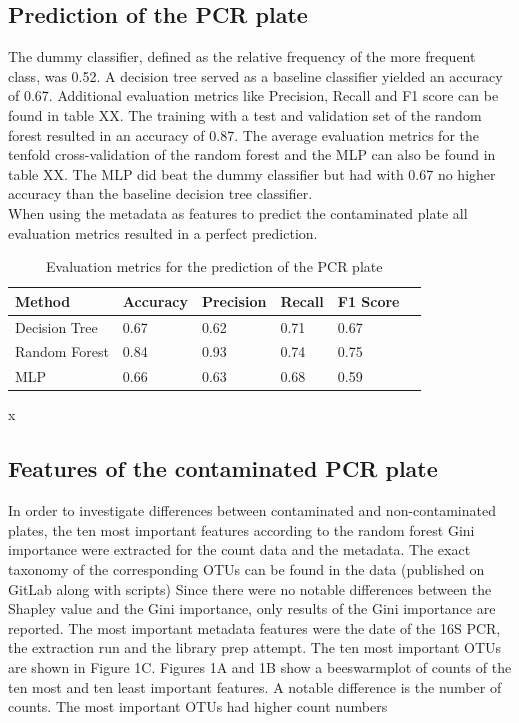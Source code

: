 \documentclass{svproc}
\begin{document}
\subsection{Prediction of the PCR plate}
The dummy classifier, defined as the relative frequency of the more frequent class, was 0.52. A decision tree served as a baseline classifier yielded an accuracy of 0.67. Additional evaluation metrics like Precision, Recall and F1 score can be found in table XX. The training with a test and validation set of the random forest resulted in an accuracy of 0.87. The average evaluation metrics for the tenfold cross-validation of the random forest and the MLP can also be found in table XX. The MLP did beat the dummy classifier but had with 0.67 no higher accuracy than the baseline decision tree classifier. \\
When using the metadata as features to predict the contaminated plate all evaluation metrics resulted in a perfect prediction.
\begin{table}
   \caption{Evaluation metrics for the prediction of the PCR plate}
   \begin{center}
       \begin{tabular}{l@{\quad}lllll}
           \hline
         
                  Method & Accuracy & Precision & Recall & F1 Score\\[2pt]
                                   \hline\rule{0pt}{12pt}
                   Decision Tree  &    0.67 & 0.62 & 0.71 & 0.67 \\
                   Random Forest &    0.84 & 0.93 & 0.74 & 0.75 \\
                   MLP   &    0.66 & 0.63 & 0.68 & 0.59 \\
                   [2pt]
                   \hline
       \end{tabular}
   \end{center}x
   \label{tab1}
\end{table}


\subsection{Features of the contaminated PCR plate}
In order to investigate differences between contaminated and non-contaminated plates, the ten most important features according to the random forest Gini importance were extracted for the count data and the metadata. The exact taxonomy of the corresponding OTUs can be found in the data (published on GitLab along with scripts) Since there were no notable differences between the Shapley value and the Gini importance, only results of the Gini importance are reported.
The most important metadata features were the date of the 16S PCR, the extraction run and the library prep attempt. The ten most important OTUs are shown in Figure 1C. Figures 1A and 1B show a beeswarmplot of counts of the ten most and ten least important features. A notable difference is the number of counts. The most important OTUs had higher count numbers
\end{document}
